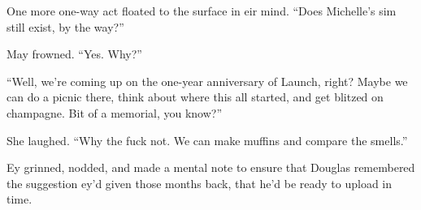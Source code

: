 One more one-way act floated to the surface in eir mind. ``Does Michelle's sim still exist, by the way?''

May frowned. ``Yes. Why?''

``Well, we're coming up on the one-year anniversary of Launch, right? Maybe we can do a picnic there, think about where this all started, and get blitzed on champagne. Bit of a memorial, you know?''

She laughed. ``Why the fuck not. We can make muffins and compare the smells.''

Ey grinned, nodded, and made a mental note to ensure that Douglas remembered the suggestion ey'd given those months back, that he'd be ready to upload in time.
